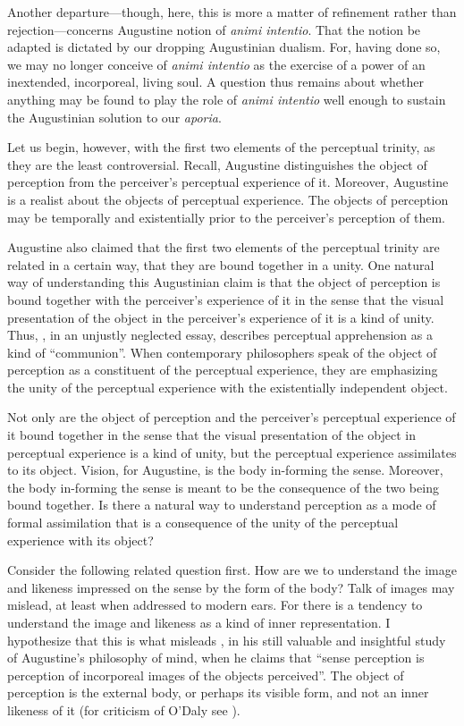 \documentclass[12pt]{article}
\begin{document}
Another departure---though, here, this is more a matter of refinement rather than rejection---concerns Augustine notion of \emph{animi intentio}. That the notion be adapted is dictated by our dropping Augustinian dualism. For, having done so, we may no longer conceive of \emph{animi intentio} as the exercise of a power of an inextended, incorporeal, living soul. A question thus remains about whether anything may be found to play the role of \emph{animi intentio} well enough to sustain the Augustinian solution to our \emph{aporia}.

Let us begin, however, with the first two elements of the perceptual trinity, as they are the least controversial. Recall, Augustine distinguishes the object of perception from the perceiver's perceptual experience of it. Moreover, Augustine is a realist about the objects of perceptual experience. The objects of perception may be temporally and existentially prior to the perceiver's perception of them. 

Augustine also claimed that the first two elements of the perceptual trinity are related in a certain way, that they are bound together in a unity. One natural way of understanding this Augustinian claim is that the object of perception is bound together with the perceiver's experience of it in the sense that the visual presentation of the object in the perceiver's experience of it is a kind of unity. Thus, \citet{Ardley:1958aa}, in an unjustly neglected essay, describes perceptual apprehension as a kind of ``communion''. When contemporary philosophers speak of the object of perception as a constituent of the perceptual experience, they are emphasizing the unity of the perceptual experience with the existentially independent object. 

Not only are the object of perception and the perceiver's perceptual experience of it bound together in the sense that the visual presentation of the object in perceptual experience is a kind of unity, but the perceptual experience assimilates to its object. Vision, for Augustine, is the body in-forming the sense. Moreover, the body in-forming the sense is meant to be the consequence of the two being bound together. Is there a natural way to understand perception as a mode of formal assimilation that is a consequence of the unity of the perceptual experience with its object? 

Consider the following related question first. How are we to understand the image and likeness impressed on the sense by the form of the body? Talk of images may mislead, at least when addressed to modern ears. For there is a tendency to understand the image and likeness as a kind of inner representation. I hypothesize that this is what misleads \citet[106]{ODaly:1987fq}, in his still valuable and insightful study of Augustine's philosophy of mind, when he claims that ``sense perception is perception of incorporeal images of the objects perceived''. The object of perception is the external body, or perhaps its visible form, and not an inner likeness of it (for criticism of O'Daly see \citealt{Brittain:2002hl,Matthews:2014aa,Silva:2014bh}).
\end{document}
